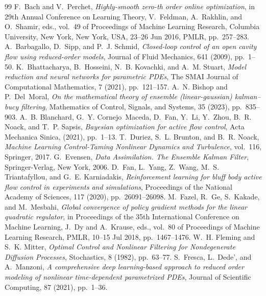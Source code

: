 \documentclass[10pt,a4paper]{amsart}
\begin{document}
\begin{thebibliography}{99}
 {\sc F.~Bach and V.~Perchet}, {\em Highly-smooth zero-th order online optimization}, in 29th Annual Conference on Learning Theory, V.~Feldman, A.~Rakhlin, and O.~Shamir, eds., vol.~49 of Proceedings of Machine Learning Research, Columbia University, New York, New York, USA, 23--26 Jun 2016, PMLR, pp.~257--283.
 {\sc A.~Barbagallo, D.~Sipp, and P.~J. Schmid}, {\em Closed-loop control of an open cavity flow using reduced-order models}, Journal of Fluid Mechanics, 641 (2009), pp.~1--50.
 {\sc K.~Bhattacharya, B.~Hosseini, N.~B. Kovachki, and A.~M. Stuart}, {\em Model reduction and neural networks for parametric {PDE}s}, The SMAI Journal of Computational Mathematics, 7 (2021), pp.~121--157.
 {\sc A.~N. Bishop and P.~Del~Moral}, {\em On the mathematical theory of ensemble (linear-gaussian) kalman--bucy filtering}, Mathematics of Control, Signals, and Systems, 35 (2023), pp.~835--903.
 {\sc A.~B. Blanchard, G.~Y. Cornejo~Maceda, D.~Fan, Y.~Li, Y.~Zhou, B.~R. Noack, and T.~P. Sapsis}, {\em Bayesian optimization for active flow control}, Acta Mechanica Sinica, (2021), pp.~1--13.
 {\sc T.~Duriez, S.~L. Brunton, and B.~R. Noack}, {\em Machine Learning Control-Taming Nonlinear Dynamics and Turbulence}, vol.~116, Springer, 2017.
 {\sc G.~Evensen}, {\em Data Assimilation. {T}he Ensemble {K}alman Filter}, Springer-Verlag, New York, 2006.
 {\sc D.~Fan, L.~Yang, Z.~Wang, M.~S. Triantafyllou, and G.~E. Karniadakis}, {\em Reinforcement learning for bluff body active flow control in experiments and simulations}, Proceedings of the National Academy of Sciences, 117 (2020), pp.~26091--26098.
 {\sc M.~Fazel, R.~Ge, S.~Kakade, and M.~Mesbahi}, {\em Global convergence of policy gradient methods for the linear quadratic regulator}, in Proceedings of the 35th International Conference on Machine Learning, J.~Dy and A.~Krause, eds., vol.~80 of Proceedings of Machine Learning Research, PMLR, 10--15 Jul 2018, pp.~1467--1476.
 {\sc W.~H. Fleming and S.~K. Mitter}, {\em Optimal {Control} and {Nonlinear} {Filtering} for {Nondegenerate} {Diffusion} {Processes}}, Stochastics, 8 (1982), pp.~63--77.
 {\sc S.~Fresca, L.~Dede’, and A.~Manzoni}, {\em A comprehensive deep learning-based approach to reduced order modeling of nonlinear time-dependent parametrized {PDE}s}, Journal of Scientific Computing, 87 (2021), pp.~1--36.

\end{thebibliography}
\end{document}
